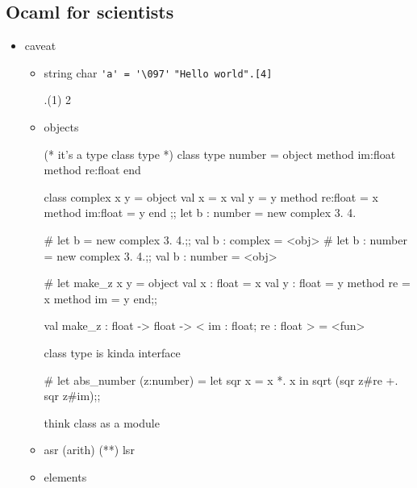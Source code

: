 \subsection{Ocaml for scientists}
\label{sec:ocaml-scientists}
\begin{itemize}
\item caveat
  \begin{itemize}
  \item string char
    \verb|'a' = '\097'|
    \verb|"Hello world".[4]|

\begin{alternate}
  [|1;2;3|].(1)
  2 
\end{alternate}

  \item objects

\begin{redcode}

(* it's a type class type *)
class type number = object
  method im:float
  method re:float 
end
\end{redcode}

\begin{redcode}
class complex x y = object 
    val x = x
    val y = y
    method re:float = x
    method im:float = y
end ;;
let b : number = new complex 3. 4.
\end{redcode}

\begin{alternate}
# let b = new complex 3. 4.;;
val b : complex = <obj>
# let b : number = new complex 3. 4.;;
val b : number = <obj>
 \end{alternate}

\begin{redcode} 
# let make_z x y = object
    val x : float = x
    val y : float = y
    method re = x
    method im = y
    end;;
  \end{redcode}
\begin{bluecode}  
val make_z : float -> float -> < im : float; re : float > = <fun>
\end{bluecode}

class type is kinda interface

  
\begin{redcode}
# let abs_number (z:number) = 
       let sqr x = x *. x in 
       sqrt (sqr z#re +. sqr z#im);;
     \end{redcode}
     
think class as a module 


  \item asr (arith) (**) lsr
  \item elements


\end{itemize}
\end{itemize}

